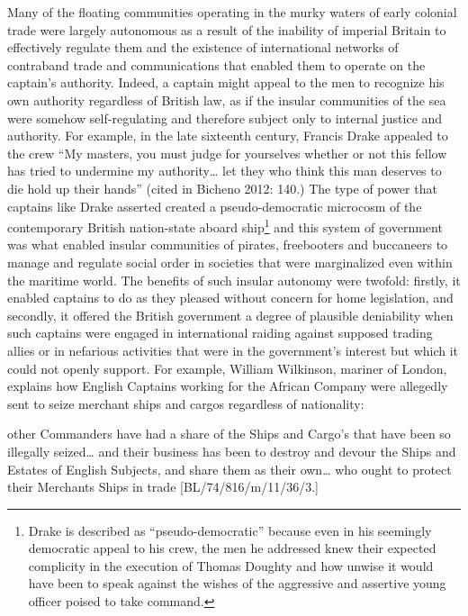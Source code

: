 \begin{styleStandard}
Many of the floating communities operating in the murky waters of early colonial trade were largely autonomous as a result of the inability of imperial Britain to effectively regulate them and the existence of international networks of contraband trade and communications that enabled them to operate on the captain’s authority. Indeed, a captain might appeal to the men to recognize his own authority regardless of British law, as if the insular communities of the sea were somehow self-regulating and therefore subject only to internal justice and authority. For example, in the late sixteenth century, Francis Drake appealed to the crew “My masters, you must judge for yourselves whether or not this fellow has tried to undermine my authority… let they who think this man deserves to die hold up their hands” (cited in Bicheno 2012: 140.) The type of power that captains like Drake asserted created a pseudo-democratic microcosm of the contemporary British nation-state aboard ship\footnote{ Drake is described as “pseudo-democratic” because even in his seemingly democratic appeal to his crew, the men he addressed knew their expected complicity in the execution of Thomas Doughty and how unwise it would have been to speak against the wishes of the aggressive and assertive young officer poised to take command. } and this system of government was what enabled insular communities of pirates, freebooters and buccaneers to manage and regulate social order in societies that were marginalized even within the maritime world. The benefits of such insular autonomy were twofold: firstly, it enabled captains to do as they pleased without concern for home legislation, and secondly, it offered the British government a degree of plausible deniability when such captains were engaged in international raiding against supposed trading allies or in nefarious activities that were in the government’s interest but which it could not openly support. For example, William Wilkinson, mariner of London, explains how English Captains working for the African Company were allegedly sent to seize merchant ships and cargos regardless of nationality: 
\end{styleStandard}

\begin{styleStandard}
other Commanders have had a share of the Ships and Cargo’s that have been so illegally seized… and their business has been to destroy and devour the Ships and Estates of English Subjects, and share them as their own… who ought to protect their Merchants Ships in trade [BL/74/816/m/11/36/3.] 
\end{styleStandard}

